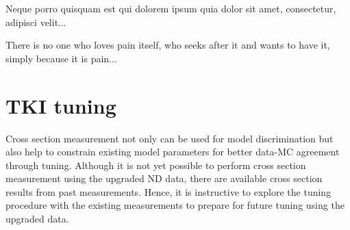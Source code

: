 \begin{savequote}[8cm]
\textlatin{Neque porro quisquam est qui dolorem ipsum quia dolor sit amet, consectetur, adipisci velit...}

There is no one who loves pain itself, who seeks after it and wants to have it, simply because it is pain...
\end{savequote}

\chapter{\label{ch:tuning}TKI tuning} 

\minitoc

Cross section measurement not only can be used for model discrimination but also help to constrain existing model parameters for better data-MC agreement through tuning. 
Although it is not yet possible to perform cross section measurement using the upgraded ND data, there are available cross section results from past measurements. 
Hence, it is instructive to explore the tuning procedure with the existing measurements to prepare for future tuning using the upgraded data.

